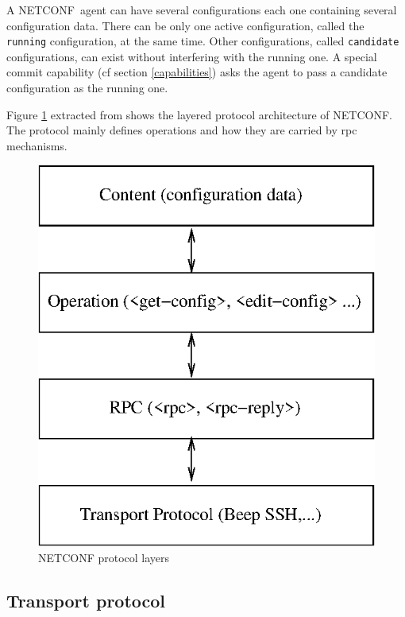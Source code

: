 \documentclass[a4paper]{article}
\newcommand{\nc}{NETCONF}
\begin{document}
A \nc\ agent can have several configurations each one containing
several configuration data.  There can be only one active
configuration, called the {\tt running} configuration, at the same
time. Other configurations, called {\tt candidate} configurations, can
exist without interfering with the running one.  A special commit
capability (cf section \ref{capabilities}) asks the agent to pass a
candidate configuration as the running one.


Figure  \ref{netconfarchi}  extracted  from \cite{rfc4741}  shows  the
layered protocol architecture of NETCONF.  The protocol mainly defines
operations and how they are carried by rpc mechanisms.

\begin{figure}[htbp]
\begin{center}
\includegraphics[scale = .7]{netconfarchi.eps}
\end{center}
\caption{NETCONF protocol layers}
\label{netconfarchi}
\end{figure}



\subsection{Transport protocol}
\end{document}
